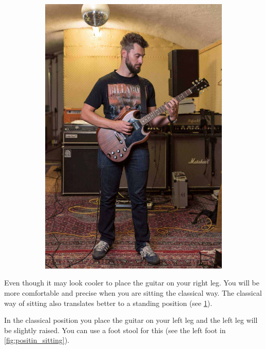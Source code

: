 \begin{figure}[h]
\begin{subfigure}[b]{0.45\textwidth}
    \includegraphics[width=\textwidth]{../../Images/Letty_Guitar-Shooting_standing.jpg}
    \caption{}
    \label{fig:positin_standing}
  \end{subfigure}
  \caption{\cite{SitStandPosition}}
  \label{fig:positin}
\end{figure}


Even though it may look cooler to place the guitar on your right leg. You will be more comfortable and precise when you are sitting the classical way. The classical way of sitting also translates better to a standing position (see \ref{fig:positin_standing}).

In the classical position you place the guitar on your left leg and the left leg will be slightly raised. You can use a foot stool for this (see the left foot in \ref{fig:positin_sitting}).